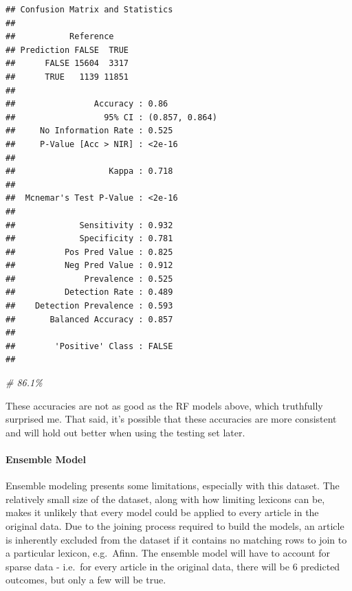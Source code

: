 \documentclass[
]{article}
\newenvironment{Shaded}{\begin{snugshade}}{\end{snugshade}}
\newcommand{\CommentTok}[1]{\textcolor[rgb]{0.56,0.35,0.01}{\textit{#1}}}
\newcommand{\FunctionTok}[1]{\textcolor[rgb]{0.00,0.00,0.00}{#1}}
\newcommand{\NormalTok}[1]{#1}
\newcommand{\SpecialCharTok}[1]{\textcolor[rgb]{0.00,0.00,0.00}{#1}}
\begin{document}
\begin{Shaded}
\end{Shaded}

\begin{verbatim}
## Confusion Matrix and Statistics
## 
##           Reference
## Prediction FALSE  TRUE
##      FALSE 15604  3317
##      TRUE   1139 11851
##                                         
##                Accuracy : 0.86          
##                  95% CI : (0.857, 0.864)
##     No Information Rate : 0.525         
##     P-Value [Acc > NIR] : <2e-16        
##                                         
##                   Kappa : 0.718         
##                                         
##  Mcnemar's Test P-Value : <2e-16        
##                                         
##             Sensitivity : 0.932         
##             Specificity : 0.781         
##          Pos Pred Value : 0.825         
##          Neg Pred Value : 0.912         
##              Prevalence : 0.525         
##          Detection Rate : 0.489         
##    Detection Prevalence : 0.593         
##       Balanced Accuracy : 0.857         
##                                         
##        'Positive' Class : FALSE         
## 
\end{verbatim}

\begin{Shaded}
\begin{Highlighting}[]
\CommentTok{\# 86.1\%}
\end{Highlighting}
\end{Shaded}

These accuracies are not as good as the RF models above, which
truthfully surprised me. That said, it's possible that these accuracies
are more consistent and will hold out better when using the testing set
later.

\hypertarget{ensemble-model}{%
\paragraph{Ensemble Model}\label{ensemble-model}}

Ensemble modeling presents some limitations, especially with this
dataset. The relatively small size of the dataset, along with how
limiting lexicons can be, makes it unlikely that every model could be
applied to every article in the original data. Due to the joining
process required to build the models, an article is inherently excluded
from the dataset if it contains no matching rows to join to a particular
lexicon, e.g.~Afinn. The ensemble model will have to account for sparse
data - i.e.~for every article in the original data, there will be 6
predicted outcomes, but only a few will be true.
\end{document}
